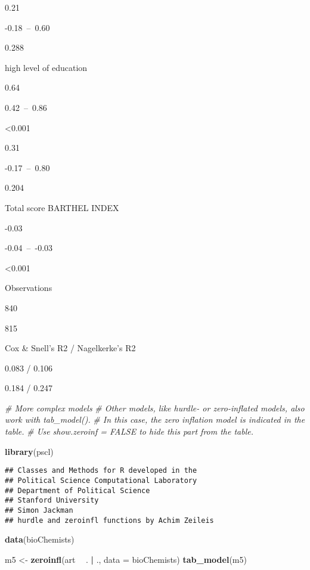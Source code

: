 \documentclass[]{article}
\newenvironment{Shaded}{\begin{snugshade}}{\end{snugshade}}
\newcommand{\KeywordTok}[1]{\textcolor[rgb]{0.13,0.29,0.53}{\textbf{#1}}}
\newcommand{\DataTypeTok}[1]{\textcolor[rgb]{0.13,0.29,0.53}{#1}}
\newcommand{\StringTok}[1]{\textcolor[rgb]{0.31,0.60,0.02}{#1}}
\newcommand{\CommentTok}[1]{\textcolor[rgb]{0.56,0.35,0.01}{\textit{#1}}}
\newcommand{\OperatorTok}[1]{\textcolor[rgb]{0.81,0.36,0.00}{\textbf{#1}}}
\newcommand{\NormalTok}[1]{#1}
\begin{document}
0.21

-0.18~--~0.60

0.288

high level of education

0.64

0.42~--~0.86

\textless{}0.001

0.31

-0.17~--~0.80

0.204

Total score BARTHEL INDEX

-0.03

-0.04~--~-0.03

\textless{}0.001

Observations

840

815

Cox \& Snell's R2 / Nagelkerke's R2

0.083 / 0.106

0.184 / 0.247

\begin{Shaded}
\begin{Highlighting}[]
\CommentTok{# More complex models}
\CommentTok{# Other models, like hurdle- or zero-inflated models, also work with tab_model().}
\CommentTok{# In this case, the zero inflation model is indicated in the table.}
\CommentTok{# Use show.zeroinf = FALSE to hide this part from the table.}

\KeywordTok{library}\NormalTok{(pscl)}
\end{Highlighting}
\end{Shaded}

\begin{verbatim}
## Classes and Methods for R developed in the
## Political Science Computational Laboratory
## Department of Political Science
## Stanford University
## Simon Jackman
## hurdle and zeroinfl functions by Achim Zeileis
\end{verbatim}

\begin{Shaded}
\begin{Highlighting}[]
\KeywordTok{data}\NormalTok{(bioChemists)}

\NormalTok{m5 <-}\StringTok{ }\KeywordTok{zeroinfl}\NormalTok{(art }\OperatorTok{~}\StringTok{ }\NormalTok{. }\OperatorTok{|}\StringTok{ }\NormalTok{., }\DataTypeTok{data =}\NormalTok{ bioChemists)}
\KeywordTok{tab_model}\NormalTok{(m5)}
\end{Highlighting}
\end{Shaded}
\end{document}
